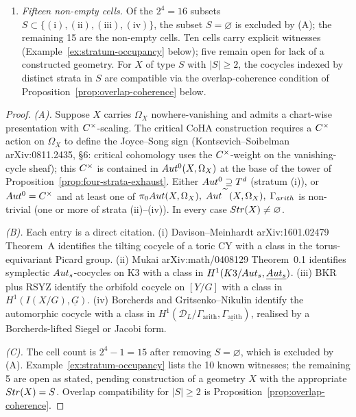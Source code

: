 \begin{theorem}
\begin{enumerate}
\begin{itemize}
  lifts; 8-form Gritsenko--Cl\'ery catalogue per CLAUDE.md key-fact.
  A single unified $\Gamma_{\mathrm{arith}}$-valued statement
  across all such automorphic forms is conjectural.)
\end{itemize}
\item[(C)] \emph{Fifteen non-empty cells.} Of the $2^4 = 16$
  subsets $S \subset \{(\text{i}), (\text{ii}), (\text{iii}),
  (\text{iv})\}$, the subset $S = \varnothing$ is excluded by (A);
  the remaining 15 are the non-empty cells. Ten cells carry
  explicit witnesses (Example~\ref{ex:stratum-occupancy} below);
  five remain open for lack of a constructed geometry. For $X$ of
  type $S$ with $|S| \geq 2$, the cocycles indexed by distinct
  strata in $S$ are compatible via the overlap-coherence
  condition of
  Proposition~\ref{prop:overlap-coherence} below.
\end{enumerate}
\end{theorem}

\begin{proof}[Proof]
\emph{(A).} Suppose $X$ carries $\Omega_X$ nowhere-vanishing and
admits a chart-wise presentation with $C^\times$-scaling. The
critical CoHA construction requires a $C^\times$ action on
$\Omega_X$ to define the Joyce--Song sign
(Kontsevich--Soibelman arXiv:0811.2435, \S 6: critical cohomology
uses the $C^\times$-weight on the vanishing-cycle sheaf); this
$C^\times$ is contained in $Aut^0(X, \Omega_X)$ at the base of
the tower of Proposition~\ref{prop:four-strata-exhaust}. Either
$Aut^0 \supseteq T^d$ (stratum (i)), or $Aut^0 = C^\times$ and
at least one of $\pi_0 Aut(X, \Omega_X),\;
Aut^{\widetilde{\phantom{X}}}(X, \Omega_X),\;
\Gamma_{arith}$ is non-trivial (one or more of strata
(ii)--(iv)). In every case $Str(X) \neq \varnothing$.

\emph{(B).} Each entry is a direct citation. (i) Davison--Meinhardt
arXiv:1601.02479 Theorem~A identifies the tilting cocycle of a
toric CY with a class in the torus-equivariant Picard group.
(ii) Mukai arXiv:math/0408129 Theorem~0.1 identifies symplectic
$Aut_s$-cocycles on K3 with a class in
$H^1(K3 / Aut_s, \underline{Aut_s})$. (iii) BKR plus RSYZ
identify the orbifold cocycle on $[Y/G]$ with a class in
$H^1(I(X/G), \underline{G})$. (iv) Borcherds and
Gritsenko--Nikulin identify the automorphic cocycle with a class
in $H^1(\mathcal{D}_L / \Gamma_{\mathrm{arith}},
\underline{\Gamma_{\mathrm{arith}}})$, realised by a
Borcherds-lifted Siegel or Jacobi form.

\emph{(C).} The cell count is $2^4 - 1 = 15$ after removing
$S = \varnothing$, which is excluded by (A).
Example~\ref{ex:stratum-occupancy} lists the 10 known witnesses;
the remaining 5 are open as stated, pending construction of a
geometry $X$ with the appropriate $Str(X) = S$. Overlap
compatibility for $|S| \geq 2$ is
Proposition~\ref{prop:overlap-coherence}.
\end{proof}

